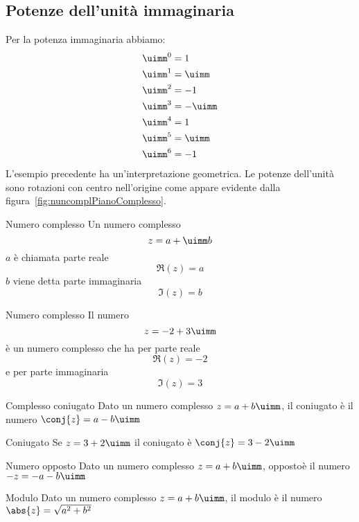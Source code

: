 \subsection{Potenze dell'unità immaginaria}
Per la potenza immaginaria abbiamo:
\begin{align*}
	&\uimm^0=1\\
	&\uimm^1=\uimm\\
	&\uimm^2=-1\\
	&\uimm^3=-\uimm\\
	&\uimm^4=1\\
	&\uimm^5=\uimm\\
	&\uimm^6=-1
\end{align*}
L'esempio precedente ha un'interpretazione geometrica. Le potenze dell'unità sono rotazioni  con  centro nell'origine come appare evidente dalla figura~\vref{fig:nuncomplPianoComplesso}.
\begin{definizionet}{Numero complesso}{}
	 Un numero complesso  \[z=a+\uimm b\] $a$ è chiamata parte reale \[\Re\left(z\right)=a\]
	$b$ viene detta  parte immaginaria\[\Im\left(z\right)=b \] 
\end{definizionet}
\begin{esempiot}{Numero complesso}{}
Il numero \[z=-2+3\uimm \] è un numero complesso che ha per parte reale \[\Re(z)=-2\]  e per parte immaginaria \[\Im(z)=3\]
\end{esempiot}
\begin{definizionet}{Complesso coniugato}{}
	Dato un numero complesso $z=a+b\uimm$, il coniugato è  il numero $\conj{z}=a-b\uimm$
\end{definizionet}
\begin{esempiot}{Coniugato}{}
Se $z=3+2\uimm$ il coniugato è $\conj{z}=3-2\uimm$ 
\end{esempiot}
\begin{definizionet}{Numero opposto}{}
Dato un numero complesso $z=a+b\uimm$,  oppostoè  il numero $-z=-a-b\uimm$
\end{definizionet}
\begin{definizionet}{Modulo}{}
Dato un numero  complesso $z=a+b\uimm$, il modulo è il numero $\abs{z}=\sqrt{a^2+b^2}$
\end{definizionet}
